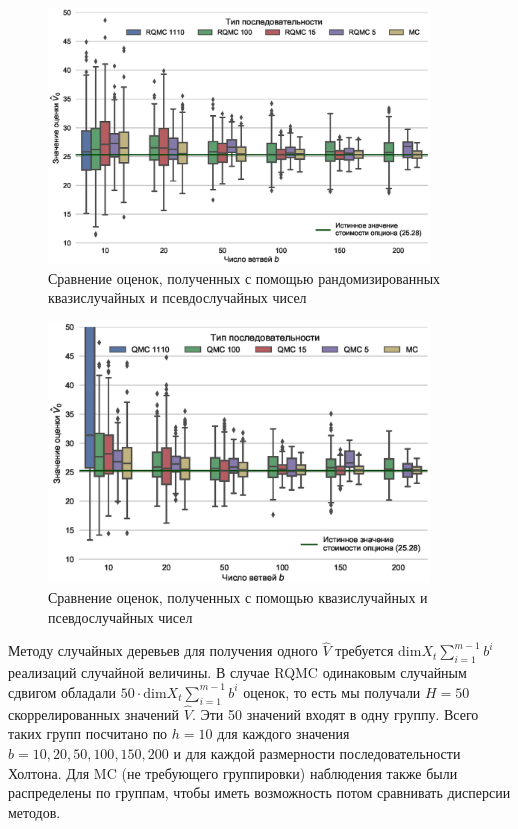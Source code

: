 \documentclass{article}
\newcommand{\Vhat}{\hat{V}}
\begin{document}
\begin{figure}[h]
    \centering
	\includegraphics[width=0.9\textwidth]{RQMC_MC.eps}
	\caption{Сравнение оценок, полученных с помощью рандомизированных квазислучайных и псевдослучайных чисел}
	\label{fig:RQMC_MC}
\end{figure}

\begin{figure}[h]
    \centering
	\includegraphics[width=0.9\textwidth]{QMC_MC.eps}
	\caption{Сравнение оценок, полученных с помощью квазислучайных и псевдослучайных чисел}
	\label{fig:QMC_MC}
\end{figure}

Методу случайных деревьев для получения одного $\Vhat$ требуется $\mathrm{dim} X_t \sum_{i=1}^{m-1} b^i$ реализаций случайной величины. В случае RQMC одинаковым случайным сдвигом обладали $50 \cdot \mathrm{dim} X_t \sum_{i=1}^{m-1} b^i$ оценок, то есть мы получали $H = 50$ скоррелированных значений $\Vhat$. Эти 50 значений входят в одну группу. Всего таких групп посчитано по $h = 10$ для каждого значения $b = 10, 20, 50, 100, 150, 200$ и для каждой размерности последовательности Холтона. Для MC (не требующего группировки) наблюдения также были распределены по группам, чтобы иметь возможность потом сравнивать дисперсии методов.
\end{document}
